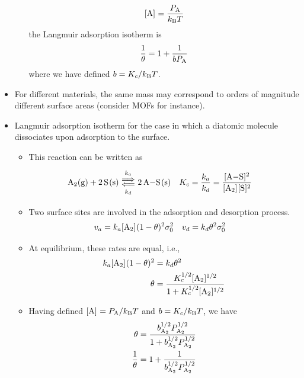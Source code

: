\documentclass[../notes.tex]{subfiles}
\begin{document}
\begin{itemize}
\begin{itemize}
        \begin{align*}
            \cnc{A} = \frac{P_{\ce{A}}}{\kB T}
        \end{align*}
        the Langmuir adsorption isotherm is
        \begin{equation*}
            \frac{1}{\theta} = 1+\frac{1}{bP_{\ce{A}}}
        \end{equation*}
        where we have defined $b=K_c/k_\text{B} T$.
    \end{itemize}
    \item For different materials, the same mass may correspond to orders of magnitude different surface areas (consider MOFs for instance).
    \item Langmuir adsorption isotherm for the case in which a diatomic molecule dissociates upon adsorption to the surface.
    \begin{itemize}
        \item This reaction can be written as
        \begin{align*}
            \ce{A2(g) + 2S(s)} &\Longleftrightarrows[k_a][k_d] \ce{2A-S(s)}&
            K_c &= \frac{k_a}{k_d}
                = \frac{\cnc{A-S}^2}{\cnc{A2}\cnc{S}^2}
        \end{align*}
        \item Two surface sites are involved in the adsorption and desorption process.
        \begin{align*}
            v_a &= k_a\cnc{A2}(1-\theta)^2\sigma_0^2&
            v_d &= k_d\theta^2\sigma_0^2
        \end{align*}
        \item At equilibrium, these rates are equal, i.e.,
        \begin{align*}
            k_a\cnc{A2}(1-\theta)^2 &= k_d\theta^2\\
            \theta &= \frac{K_c^{1/2}\cnc{A2}^{1/2}}{1+K_c^{1/2}\cnc{A2}^{1/2}}
        \end{align*}
        \item Having defined $\cnc{A}=P_{\ce{A}}/\kB T$ and $b=K_c/k_\text{B} T$, we have
        \begin{align*}
            \theta &= \frac{b_{\ce{A2}}^{1/2}P_{\ce{A2}}^{1/2}}{1+b_{\ce{A2}}^{1/2}P_{\ce{A2}}^{1/2}}\\
            \frac{1}{\theta} &= 1+\frac{1}{b_{\ce{A2}}^{1/2}P_{\ce{A2}}^{1/2}}
        \end{align*}
    \end{itemize}
\end{itemize}
\end{document}
